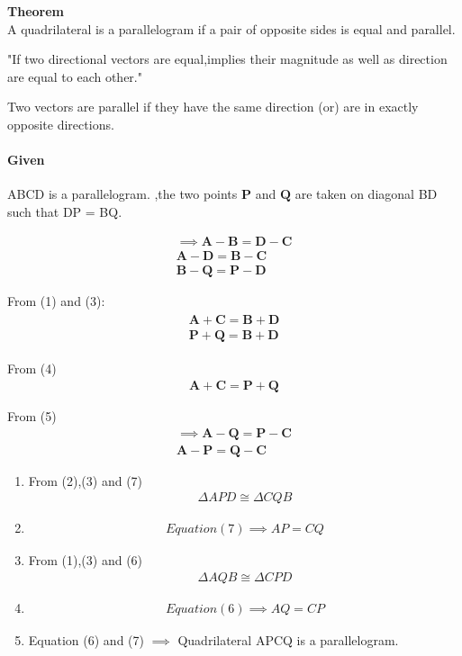 \documentclass[10pt, a4paper]{article}
\let\vec\mathbf
\begin{document}
\textbf{Theorem}\\
A quadrilateral is a parallelogram if a pair of opposite sides
is equal and parallel.

"If two directional vectors are equal,implies their magnitude as well as direction are equal to each other."

Two vectors are parallel if they have the same direction (or) are in exactly opposite directions.

\paragraph{Given} ABCD is a parallelogram.
 ,the two points $\vec{P}$ and $\vec{Q}$ are taken on diagonal BD such that DP = BQ.



\begin{align}
   \implies \vec{A}-\vec{B} =\vec{D}-\vec{C} \\
    \vec{A}-\vec{D} =\vec{B}-\vec{C}\\
    \vec{B}-\vec{Q} =\vec{P}-\vec{D}
\end{align}

From (1) and (3):
\begin{align}
\begin{split}
    \vec{A}+\vec{C} =\vec{B}+\vec{D}\\
    \vec{P}+\vec{Q} =\vec{B}+\vec{D}
\end{split}
\end{align}

From (4)
\begin{align}
    \vec{A}+\vec{C} =\vec{P}+\vec{Q}
\end{align}

From (5)
\begin{align}
     \implies  \vec{A}-\vec{Q} =\vec{P}-\vec{C}\\
    \vec{A}-\vec{P} =\vec{Q}-\vec{C}
\end{align}


\begin{enumerate}
    \item From (2),(3) and (7)
    \begin{align}
        \Delta APD \cong \Delta CQB
    \end{align}
    
    \item \begin{align}
        Equation (7) \implies AP=CQ
    \end{align}
    
     \item From (1),(3) and (6)
    \begin{align}
        \Delta AQB \cong \Delta CPD
    \end{align}

    \item \begin{align}
        Equation (6) \implies AQ=CP
    \end{align}

     \item Equation (6) and (7) 
      $\implies$  Quadrilateral APCQ is a parallelogram.
\end{enumerate}
\end{document}
